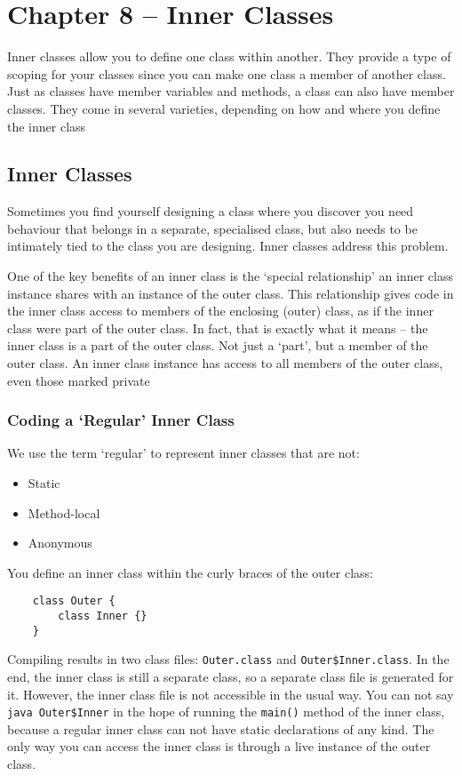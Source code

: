 \section{Chapter 8 -- Inner Classes}
Inner classes allow you to define one class within another. They provide a type 
of scoping for your classes since you can make one class a member of another 
class. Just as classes have member variables and methods, a class can also have 
member classes. They come in several varieties, depending on how and where you 
define the inner class

\subsection{Inner Classes}
Sometimes you find yourself designing a class where you discover you need 
behaviour that belongs in a separate, specialised class, but also needs to be 
intimately tied to the class you are designing. Inner classes address this 
problem.

One of the key benefits of an inner class is the `special relationship' an 
inner class instance shares with an instance of the outer class. This 
relationship gives code in the inner class access to members of the enclosing 
(outer) class, as if the inner class were part of the outer class. In fact, that 
is exactly what it means -- the inner class is a part of the outer class. Not 
just a `part', but a member of the outer class. An inner class instance has 
access to all members of the outer class, even those marked private

\subsubsection{Coding a `Regular' Inner Class}
We use the term `regular' to represent inner classes that  are not:
\begin{itemize}
    \item Static
    \item Method-local
    \item Anonymous
\end{itemize}
You define an inner class within the curly braces of the outer class:
\begin{verbatim}
    class Outer {
        class Inner {}
    }
\end{verbatim}
Compiling results in two class files: \verb#Outer.class# and 
\verb#Outer$Inner.class#. In the end, the inner class is still a separate 
class, so a separate class file is generated for it. However, the inner class 
file is not accessible in the usual way. You can not say \verb#java Outer$Inner# in the hope of running the \verb#main()# method of the inner 
class, because a regular inner class can not have static declarations of any 
kind. The only way you can access the inner class is through a live instance of 
the outer class.

